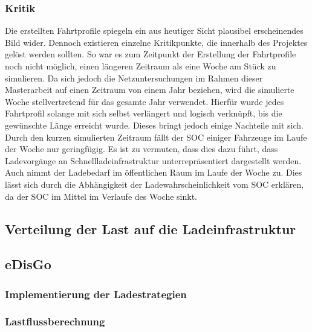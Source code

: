 


\subsubsection{Kritik}

Die erstellten Fahrtprofile spiegeln ein aus heutiger Sicht plausibel erscheinendes Bild wider.
Dennoch existieren einzelne Kritikpunkte, die innerhalb des \simbev Projektes gelöst werden sollten.
So war es zum Zeitpunkt der Erstellung der Fahrtprofile noch nicht möglich, einen längeren Zeitraum als eine Woche am Stück zu simulieren.
Da sich jedoch die Netzuntersuchungen im Rahmen dieser Masterarbeit auf einen Zeitraum von einem Jahr beziehen, wird die simulierte Woche stellvertretend für das gesamte Jahr verwendet.
Hierfür wurde jedes Fahrtprofil solange mit sich selbst verlängert und logisch verknüpft, bis die gewünschte Länge erreicht wurde.
Dieses bringt jedoch einige Nachteile mit sich.
Durch den kurzen simulierten Zeitraum fällt der \gls{SOC} einiger Fahrzeuge im Laufe der Woche nur geringfügig.
Es ist zu vermuten, dass dies dazu führt, dass Ladevorgänge an Schnellladeinfrastruktur un­ter­re­prä­sen­tiert dargestellt werden.
Auch nimmt der Ladebedarf im öffentlichen Raum im Laufe der Woche zu.
Dies lässt sich durch die Abhängigkeit der Ladewahrscheinlichkeit vom \gls{SOC} erklären, da der \gls{SOC} im Mittel im Verlaufe des Woche sinkt.


\subsection{Verteilung der Last auf die Ladeinfrastruktur}\label{chap:distribute_demand_ev}



\subsection{eDisGo}

\subsubsection{Implementierung der Ladestrategien}

\subsubsection{Lastflussberechnung}